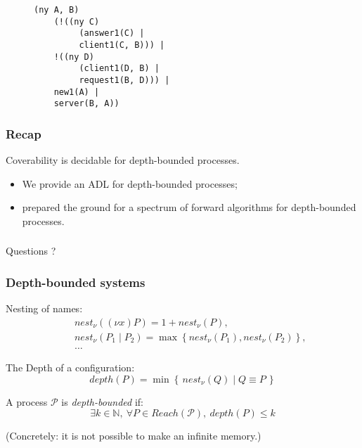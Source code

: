 \documentclass{beamer}
\newcommand{\nest}{\mathit{nest}_\nu}
\newcommand{\depth}{\mathit{depth}}
\newcommand{\set}[1]{\left\{#1\right\}}
\newcommand{\pset}[2]{\set{\,#1\mid#2\,}}
\newcommand{\process}{\mathcal{P}}
\newcommand{\Reach}{\mathit{Reach}}
\begin{document}
\begin{frame}[fragile]
\begin{figure}
\begin{minipage}{0.35\linewidth}
{\begin{verbatim}
(ny A, B)
    (!((ny C)
         (answer1(C) |
         client1(C, B))) |
    !((ny D)
         (client1(D, B) |
         request1(B, D))) |
    new1(A) |
    server(B, A))
\end{verbatim}
}
\end{minipage}
\end{figure}

\end{frame} 


\begin{frame} 
  \frametitle{Recap}
  \begin{center}
    Coverability is decidable for depth-bounded processes.
  \end{center}
  \begin{itemize}
  \item We provide an ADL for depth-bounded processes;
  \item prepared the ground for a spectrum of forward algorithms for depth-bounded processes.
  \end{itemize}
\end{frame} 

\begin{frame} 
  \frametitle{}
  \begin{center}
  {\Large Questions ?}
  \end{center}
\end{frame} 

\begin{frame}
  \frametitle{Depth-bounded systems \cite{Meyer08OnBoundednessInDepth}}
  Nesting of names:
  \begin{eqnarray*}
  & & \nest((\nu x)P) = 1 + \nest(P),\\
  & & \nest(P_1 \mid P_2) = \max\set{\nest(P_1),\nest(P_2)},\\
  & & \ldots
  \end{eqnarray*}

  The Depth of a configuration:
  \[\depth(P) = \min\pset{\nest(Q)}{Q \equiv P}\]

  A process $\process$ is \emph{depth-bounded} if:
  \[\exists k \in \mathbb{N}, ~ \forall P \in \Reach(\process), ~ \depth(P) \leq k\]

  (Concretely: it is not possible to make an infinite memory.)
\end{frame}
\end{document}
